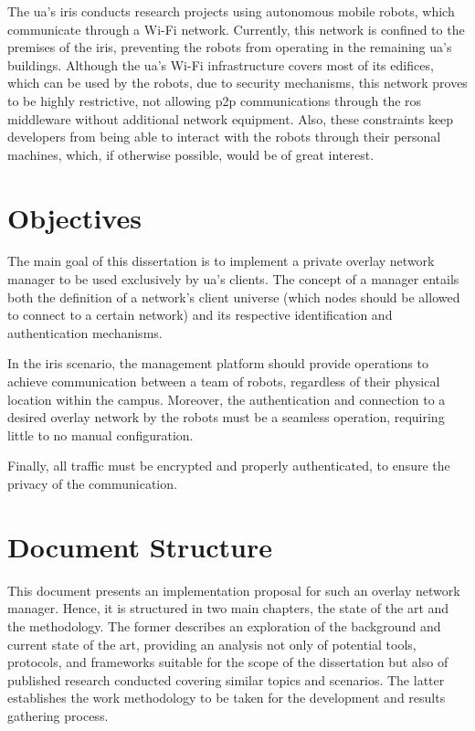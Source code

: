 \documentclass[11pt,twoside,a4paper]{report}
\begin{document}
The \ac{ua}'s \ac{iris} conducts research projects using autonomous mobile robots, which communicate through a Wi-Fi network. Currently, this network is confined to the premises of the \ac{iris}, preventing the robots from operating in the remaining \ac{ua}'s buildings. Although the \ac{ua}'s Wi-Fi infrastructure covers most of its edifices, which can be used by the robots, due to security mechanisms, this network proves to be highly restrictive, not allowing \ac{p2p} communications through the \ac{ros} ~\cite{quigley2009ros} middleware without additional network equipment. Also, these constraints keep developers from being able to interact with the robots through their personal machines, which, if otherwise possible, would be of great interest.

\section{Objectives}

The main goal of this dissertation is to implement a private overlay network manager to be used exclusively by \ac{ua}'s clients. The concept of a manager entails both the definition of a network's client universe (which nodes should be allowed to connect to a certain network) and its respective identification and authentication mechanisms.

In the \ac{iris} scenario, the management platform should provide operations to achieve communication between a team of robots, regardless of their physical location within the campus. Moreover, the authentication and connection to a desired overlay network by the robots must be a seamless operation, requiring little to no manual configuration.

Finally, all traffic must be encrypted and properly authenticated, to ensure the privacy of the communication.

\section{Document Structure}

This document presents an implementation proposal for such an overlay network manager. Hence, it is structured in two main chapters, the state of the art and the methodology. The former describes an exploration of the background and current state of the art, providing an analysis not only of potential tools, protocols, and frameworks suitable for the scope of the dissertation but also of published research conducted covering similar topics and scenarios. The latter establishes the work methodology to be taken for the development and results gathering process.
\end{document}
